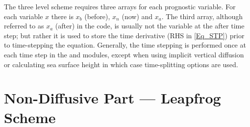 The three level scheme requires three arrays for each prognostic variable. 
For each variable $x$ there is $x_b$ (before), $x_n$ (now) and $x_a$. The third array, 
although referred to as $x_a$ (after) in the code, is usually not the variable at 
the after time step; but rather it is used to store the time derivative (RHS in 
\eqref{Eq_STP}) prior to time-stepping the equation. Generally, the time 
stepping is performed once at each time step in the  and  
modules, except when using implicit vertical diffusion or calculating sea surface height 
in which case time-splitting options are used.

\section{Non-Diffusive Part --- Leapfrog Scheme}
\label{STP_leap_frog}

